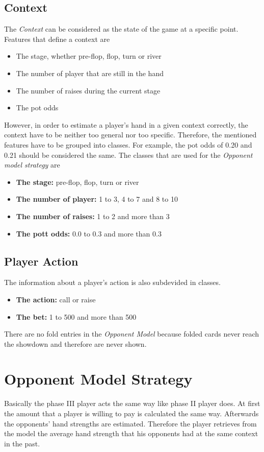 \subsection{Context}
The \emph{Context} can be considered as the state of the game at a specific point. Features that define a context are 
\begin{itemize}
	\item The stage, whether pre-flop, flop, turn or river
	\item The number of player that are still in the hand
	\item The number of raises during the current stage
	\item The pot odds
\end{itemize}

However, in order to estimate a player's hand in a given context correctly, the context have to be neither too general nor too specific. Therefore, the mentioned features have to be grouped into classes. For example, the pot odds of 0.20 and 0.21 should be considered the same. The classes that are used for the \emph{Opponent model strategy} are 
\begin{itemize}
	\item \textbf{The stage:} pre-flop, flop, turn or river
	\item \textbf{The number of player:} 1 to 3, 4 to 7 and 8 to 10
	\item \textbf{The number of raises:} 1 to 2 and more than 3
	\item \textbf{The pott odds:} 0.0 to 0.3 and more than 0.3
\end{itemize}

\subsection{Player Action}
The information about a player's action is also subdevided in classes.
\begin{itemize}
	\item \textbf{The action:}  call or raise
	\item \textbf{The bet:} 1 to 500 and more than 500
\end{itemize}
There are no fold entries in the \emph{Opponent Model} because folded cards never reach the showdown and therefore are never shown. 

\section{Opponent Model Strategy}
Basically the phase III player acts the same way like phase II player does. At first the amount that a player is willing to pay is calculated the same way. Afterwards the opponents' hand strengths are estimated. Therefore the player retrieves from the model the average hand strength that his opponents had at the same context in the past.

